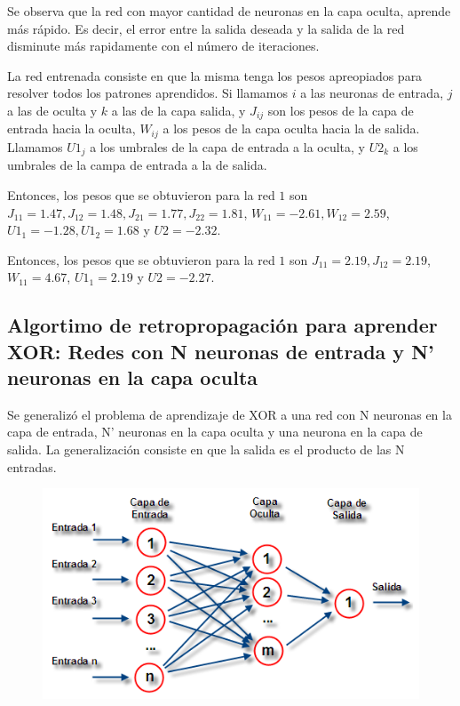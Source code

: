 \documentclass[aps,prb,onecolumn,10pt,floatfix,superscriptaddress]{article} %
\begin{document}
Se observa que la red con mayor cantidad de neuronas en la capa oculta, aprende m\'as r\'apido. Es decir, el error entre la salida deseada y la salida de la red disminute m\'as rapidamente con el n\'umero de iteraciones.

La red entrenada consiste en que la misma tenga los pesos apreopiados para resolver todos los patrones aprendidos. Si llamamos $i$ a las neuronas de entrada, $j$ a las de oculta y $k$ a las de la capa salida, y $J_{ij}$ son los pesos de la capa de entrada hacia la oculta, $W_{ij}$ a los pesos de la capa oculta hacia la de salida. Llamamos $U1_{j}$ a los umbrales de la capa de entrada a la oculta, y $U2_{k}$ a los umbrales de la campa de entrada a la de salida. 

Entonces, los pesos que se obtuvieron para la red $1$ son $J_11 = 1.47, J_{12} = 1.48, J_{21} = 1.77, J_{22} = 1.81$, $W_{11}=-2.61 , W_{12} = 2.59$, $U1_{1} = -1.28 , U1_{2} = 1.68$ y $U2 = -2.32$.

Entonces, los pesos que se obtuvieron para la red $1$ son $J_11 = 2.19, J_{12} = 2.19$, $W_{11}=4.67$, $U1_{1} =2.19$ y $U2 =-2.27$.

\subsection{Algortimo de retropropagaci\'on para aprender XOR: Redes con N neuronas de entrada y N' neuronas en la capa oculta}

Se generaliz\'o el problema de aprendizaje de XOR a una red con N neuronas en la capa de entrada, N' neuronas en la capa oculta y una neurona en la capa de salida. La generalizaci\'on consiste en que la salida es el producto de las N entradas.

\begin{figure}[!htd]
\begin{center}
 \includegraphics[scale=0.5]{red3.png}
  \caption{\label{arq3}}
  \end{center}
 \end{figure}
\end{document}
